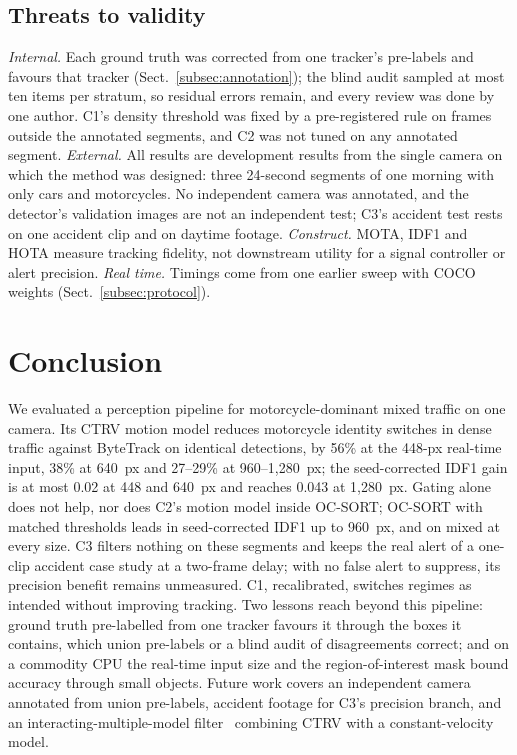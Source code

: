 \documentclass[twocolumn]{svjour3}
\begin{document}
\subsection{Threats to validity}\label{subsec:threats}

\emph{Internal.} Each ground truth was corrected from one tracker's pre-labels
and favours that tracker (Sect.~\ref{subsec:annotation}); the blind audit
sampled at most ten items per stratum, so residual errors remain, and every
review was done by one author. C1's density threshold was fixed by a
pre-registered rule on frames outside the annotated segments, and C2 was not
tuned on any annotated segment.
\emph{External.} All results are development results from the single camera on
which the method was designed: three 24-second segments of one morning with
only cars and motorcycles. No independent camera was annotated, and the
detector's validation images are not an independent test; C3's accident test
rests on one accident clip and on daytime footage. \emph{Construct.}
MOTA, IDF1 and HOTA measure tracking fidelity, not downstream utility for a
signal controller or alert precision. \emph{Real time.} Timings come from one
earlier sweep with COCO weights (Sect.~\ref{subsec:protocol}).

\section{Conclusion}\label{sec:conclusion}

We evaluated a perception pipeline for
motorcycle-dominant mixed traffic on one camera. Its CTRV motion model reduces
motorcycle identity switches in dense traffic against ByteTrack on identical
detections, by 56\% at the 448-px real-time input, 38\% at 640~px and 27--29\%
at 960--1,280~px; the seed-corrected IDF1 gain is at most 0.02 at 448 and
640~px and reaches 0.043 at 1,280~px. Gating alone does not help, nor does C2's
motion model inside OC-SORT; OC-SORT with matched thresholds leads in
seed-corrected IDF1 up to 960~px, and on mixed at every size. C3 filters
nothing on these segments and keeps the real alert of a one-clip accident case
study at a two-frame delay; with no false alert to suppress, its precision
benefit remains unmeasured. C1, recalibrated, switches
regimes as intended without improving tracking. Two lessons reach beyond this pipeline: ground truth
pre-labelled from one tracker favours it through the boxes it contains, which
union pre-labels or a blind audit of disagreements correct; and on a commodity
CPU the real-time input size and the region-of-interest mask bound accuracy
through small objects. Future work covers an
independent camera annotated from union pre-labels, accident footage for C3's
precision branch, and an
interacting-multiple-model filter~\cite{Blom1988_imm} combining CTRV with a
constant-velocity model.
\end{document}
